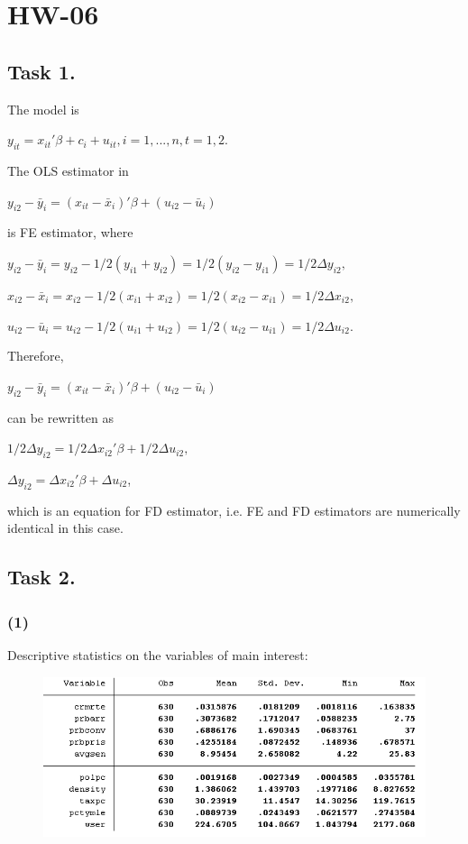 \documentclass[12pt,a4paper, oneside]{extreport}
\begin{document}



\chapter*{HW-06}

\section*{Task 1.}

The model is

$y_{it} = x_{it}'\beta + c_i  + u_{it}, i=1,...,n, t =1,2 $.

The OLS estimator in 

$y_{i2} - \bar{y}_i =  (x_{it} - \bar{x}_i)'\beta + (u_{i2}-\bar{u}_i)$

is FE estimator, where

$y_{i2} - \bar{y}_i = y_{i2} - 1/2 (y_{i1}+ y_{i2})  = 1/2 (y_{i2}- y_{i1}) = 1/2 \Delta  y_{i2}, $


$x_{i2} - \bar{x}_i = x_{i2} - 1/2 (x_{i1}+ x_{i2})  = 1/2 (x_{i2}- x_{i1}) = 1/2 \Delta  x_{i2}, $


$u_{i2} - \bar{u}_i = u_{i2} - 1/2 (u_{i1}+ u_{i2})  = 1/2 (u_{i2}- u_{i1}) = 1/2 \Delta  u_{i2}. $


Therefore,

$y_{i2} - \bar{y}_i =  (x_{it} - \bar{x}_i)'\beta + (u_{i2}-\bar{u}_i)$

can be rewritten as

$1/2 \Delta  y_{i2} =  1/2 \Delta  x_{i2}'\beta + 1/2 \Delta  u_{i2},$


$\Delta  y_{i2} =  \Delta  x_{i2}'\beta +  \Delta  u_{i2}$,

which is an equation for FD estimator, i.e. FE and FD estimators are numerically identical in this case.

\section*{Task 2.}



\subsection*{(1)}

Descriptive statistics on the variables of main interest:
\begin{figure}[H]
	\centering
	\includegraphics[width=0.7\linewidth]{screenshot002}
	\label{fig:screenshot001}
\end{figure}
\end{document}
